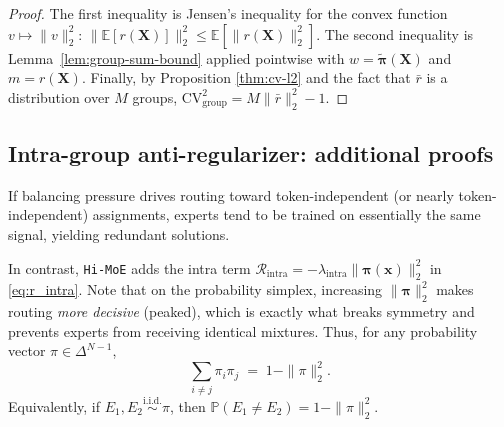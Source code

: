 \documentclass[sigconf,nonacm]{acmart}
\begin{document}
\begin{proof}
The first inequality is Jensen's inequality for the convex function $v\mapsto \|v\|_2^2$:
$\|\mathbb{E}[r(\mathbf{X})]\|_2^2 \le \mathbb{E}[\|r(\mathbf{X})\|_2^2]$.
The second inequality is Lemma~\ref{lem:group-sum-bound} applied pointwise with
$w=\widetilde{\bm{\pi}}(\mathbf{X})$ and $m=r(\mathbf{X})$.
Finally, by Proposition \ref{thm:cv-l2} and the fact that $\bar r$ is a distribution over $M$ groups,
$\mathrm{CV}_{\text{group}}^2 = M\|\bar r\|_2^2 - 1$.
\end{proof}
\subsection{Intra-group anti-regularizer: additional proofs}
\label{sec:theory-intra}

If balancing pressure drives routing toward token-independent (or nearly token-independent) assignments,
experts tend to be trained on essentially the same signal, yielding redundant solutions.



In contrast, \texttt{Hi-MoE} adds the intra term
$\mathcal{R}_{\text{intra}}=-\lambda_{\text{intra}}\|\bm{\pi}(\mathbf{x})\|_2^2$ in \eqref{eq:r_intra}.
Note that on the probability simplex, increasing $\|\bm{\pi}\|_2^2$ makes routing \emph{more decisive}
(peaked), which is exactly what breaks symmetry and prevents experts from receiving identical mixtures.
Thus, for any probability vector $\pi\in\Delta^{N-1}$,
\begin{equation}\label{lem:overlap}
\sum_{i\neq j}\pi_i\pi_j \;=\; 1-\|\pi\|_2^2.
\end{equation}
Equivalently, if $E_1,E_2\stackrel{\text{i.i.d.}}{\sim}\pi$, then
$\mathbb{P}(E_1\neq E_2)=1-\|\pi\|_2^2$.
\end{document}
